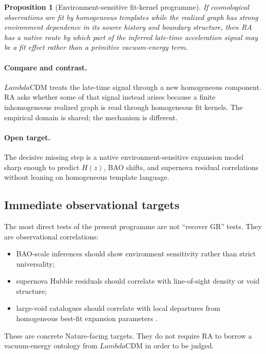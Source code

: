 \documentclass[11pt]{article}
\def\Lambda{Lambda}%
\newtheorem{proposition}{Proposition}
\begin{document}
\begin{proposition}[Environment-sensitive fit-kernel programme]
If cosmological observations are fit by homogeneous templates while the realized graph has strong environment dependence in its source history and boundary structure, then RA has a native route by which part of the inferred late-time acceleration signal may be a fit effect rather than a primitive vacuum-energy term.
\end{proposition}

\paragraph{Compare and contrast.} $\Lambda$CDM treats the late-time signal through a new homogeneous component. RA asks whether some of that signal instead arises because a finite inhomogeneous realized graph is read through homogeneous fit kernels. The empirical domain is shared; the mechanism is different.

\paragraph{Open target.} The decisive missing step is a native environment-sensitive expansion model sharp enough to predict $H(z)$, BAO shifts, and supernova residual correlations without leaning on homogeneous template language.

\subsection{Immediate observational targets}

The most direct tests of the present programme are not ``recover GR'' tests. They are observational correlations:
\begin{itemize}[nosep]
    \item BAO-scale inferences should show environment sensitivity rather than strict universality;
    \item supernova Hubble residuals should correlate with line-of-sight density or void structure;
    \item large-void catalogues should correlate with local departures from homogeneous best-fit expansion parameters \cite{Pan2012,Cautun2014,DESI2025}.
\end{itemize}

These are concrete Nature-facing targets. They do not require RA to borrow a vacuum-energy ontology from $\Lambda$CDM in order to be judged.
\end{document}
